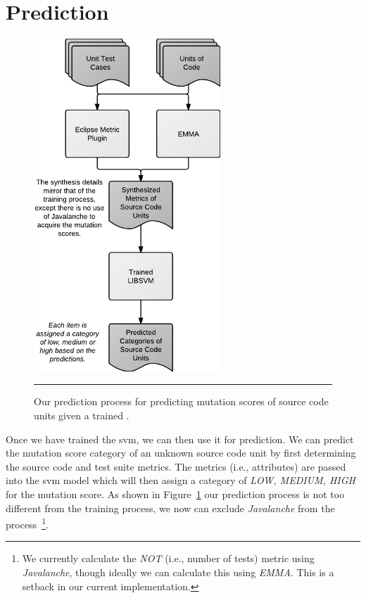 \section{Prediction}
\label{sec:approach_prediction}
\begin{figure}[!tb]
  \centering
  \includegraphics[width=7cm]{figures/process_prediction.pdf}
  \caption{Our prediction process for predicting mutation scores of source code units given a trained .}
  \label{fig:process_prediction}
  \vspace{2mm}
  \hrule
\end{figure}

Once we have trained the \gls{svm}, we can then use it for prediction. We can predict the mutation score category of an unknown source code unit by first determining the source code and test suite metrics. The metrics (i.e., attributes) are passed into the \gls{svm} model which will then assign a category of \textit{LOW, MEDIUM, HIGH} for the mutation score. As shown in Figure~\ref{fig:process_prediction} our prediction process is not too different from the training process, we now can exclude \emph{Javalanche} from the process~\footnote{We currently calculate the \emph{NOT} (i.e., number of tests) metric using \emph{Javalanche}, though ideally we can calculate this using \emph{EMMA}. This is a setback in our current implementation.}.


